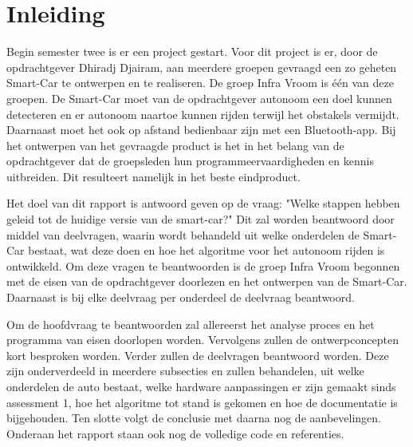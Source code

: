 \section{Inleiding}
Begin semester twee is er een project gestart. Voor dit project is er, door de opdrachtgever Dhiradj Djairam, aan meerdere groepen gevraagd een zo geheten \gls{Smart-Car} te ontwerpen en te realiseren. De groep Infra Vroom is één van deze groepen.
De \gls{Smart-Car} moet van de opdrachtgever autonoom een doel kunnen detecteren en er autonoom naartoe kunnen rijden terwijl het obstakels vermijdt. Daarnaast moet het ook op afstand bedienbaar zijn met een \gls{Bluetooth}-app.
Bij het ontwerpen van het gevraagde product is het in het belang van de opdrachtgever dat de groepsleden hun programmeervaardigheden en kennis uitbreiden. Dit resulteert namelijk in het beste eindproduct. 

Het doel van dit rapport is antwoord geven op de vraag: "Welke stappen hebben geleid tot de huidige versie van de smart-car?" 
Dit zal worden beantwoord door middel van deelvragen, waarin wordt behandeld uit welke onderdelen de \gls{Smart-Car} bestaat, wat deze doen en hoe het algoritme voor het autonoom rijden is ontwikkeld. Om deze vragen te beantwoorden is de groep Infra Vroom begonnen met de eisen van de opdrachtgever doorlezen en het ontwerpen van de \gls{Smart-Car}. Daarnaast is bij elke deelvraag per onderdeel de deelvraag beantwoord. 

Om de hoofdvraag te beantwoorden zal allereerst het analyse proces en het programma van eisen doorlopen worden. Vervolgens zullen de ontwerpconcepten kort besproken worden. Verder zullen de deelvragen beantwoord worden. Deze zijn onderverdeeld in meerdere subsecties en zullen behandelen, uit welke onderdelen de auto bestaat, welke hardware aanpassingen er zijn gemaakt sinds assessment 1, hoe het algoritme tot stand is gekomen en hoe de documentatie is bijgehouden. Ten slotte volgt de conclusie met daarna nog de aanbevelingen. Onderaan het rapport staan ook nog de volledige code en referenties.